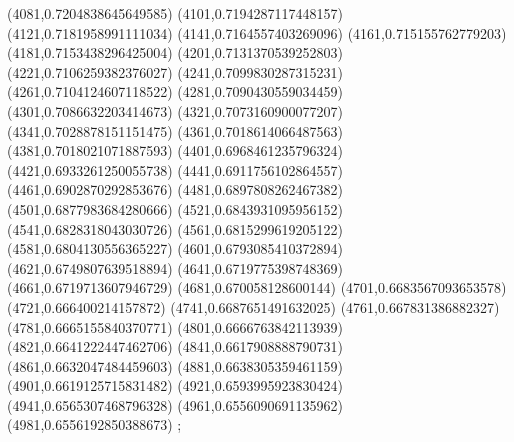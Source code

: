{(4081,0.7204838645649585)
(4101,0.7194287117448157)
(4121,0.7181958991111034)
(4141,0.7164557403269096)
(4161,0.715155762779203)
(4181,0.7153438296425004)
(4201,0.7131370539252803)
(4221,0.7106259382376027)
(4241,0.7099830287315231)
(4261,0.7104124607118522)
(4281,0.7090430559034459)
(4301,0.7086632203414673)
(4321,0.7073160900077207)
(4341,0.7028878151151475)
(4361,0.7018614066487563)
(4381,0.7018021071887593)
(4401,0.6968461235796324)
(4421,0.6933261250055738)
(4441,0.6911756102864557)
(4461,0.6902870292853676)
(4481,0.6897808262467382)
(4501,0.6877983684280666)
(4521,0.6843931095956152)
(4541,0.6828318043030726)
(4561,0.6815299619205122)
(4581,0.6804130556365227)
(4601,0.6793085410372894)
(4621,0.6749807639518894)
(4641,0.6719775398748369)
(4661,0.6719713607946729)
(4681,0.670058128600144)
(4701,0.6683567093653578)
(4721,0.666400214157872)
(4741,0.6687651491632025)
(4761,0.667831386882327)
(4781,0.6665155840370771)
(4801,0.6666763842113939)
(4821,0.6641222447462706)
(4841,0.6617908888790731)
(4861,0.6632047484459603)
(4881,0.6638305359461159)
(4901,0.6619125715831482)
(4921,0.6593995923830424)
(4941,0.6565307468796328)
(4961,0.6556090691135962)
(4981,0.6556192850388673)
};
